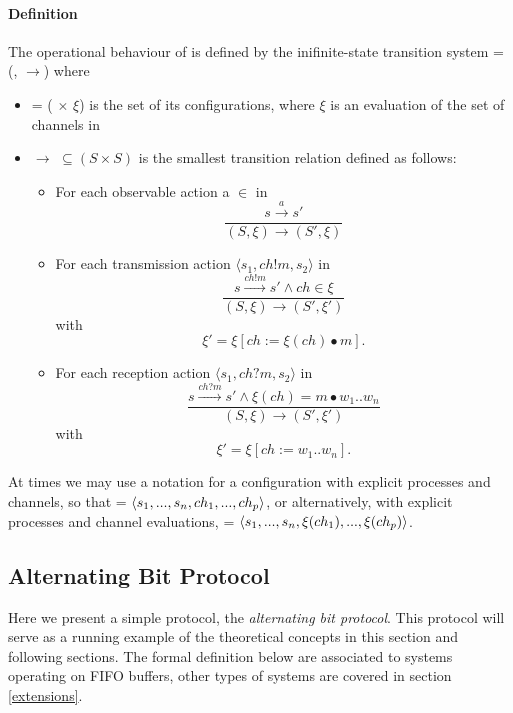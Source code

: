 \paragraph{Definition}
\label{CTS}
The operational behaviour of  is defined by the inifinite-state transition system  = (, $\rightarrow$) where
\begin{itemize}
\item[]
    = ( $\times$ $\xi$) is the set of its configurations, where $\xi$ is an evaluation of the set of channels  in 
\item[]
  $\rightarrow$ $\subseteq (S \times S)$  is the smallest transition relation defined as follows:
  \begin{itemize}
    \item
      For each observable action a $\in$  in  
      \[
      \dfrac{s \xrightarrow{a} s'}{(S, \xi) \rightarrow (S', \xi)}
      \]
    \item
      For each transmission action $\langle s_1, ch!m, s_2 \rangle$ in 
      \[
      \dfrac{s \xrightarrow{ch!m} s' \wedge ch \in \xi}{(S, \xi) \rightarrow (S', \xi')} \] with \[ \xi' = \xi[ch := \xi (ch) \bullet m].
      \]
    \item
      For each reception action $\langle s_1, ch?m, s_2 \rangle$ in 
      \[
      \dfrac{s \xrightarrow{ch?m} s' \wedge \xi(ch) = m \bullet w_1..w_n}{(S, \xi) \rightarrow (S', \xi')} \] with \[ \xi' = \xi[ch:= w_1..w_n].
      \]

  \end{itemize}
\end{itemize}

At times we may use a notation for a configuration  with explicit processes and channels, so that  = $\langle s_1,...,s_n, ch_1,...,ch_p\rangle$, or alternatively, with explicit processes and channel evaluations,  = $\langle s_1,...,s_n, \xi(ch_1),...,\xi(ch_p)\rangle$.

\subsection{Alternating Bit Protocol}
Here we present a simple protocol, the \emph{alternating bit protocol}. This protocol will serve as a running example of the theoretical concepts in this section and following sections. The formal definition below are associated to systems operating on FIFO buffers, other types of systems are covered in section \ref{extensions}. 

